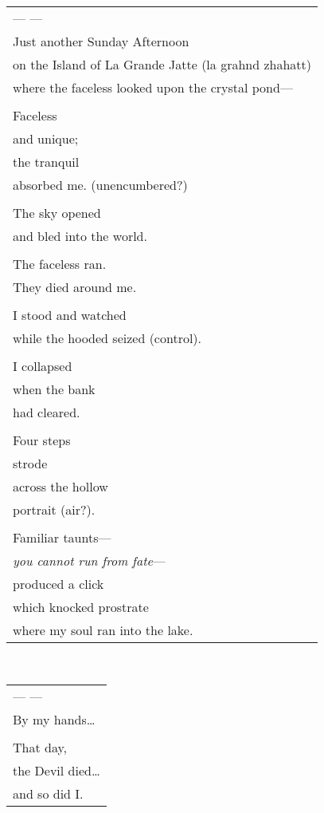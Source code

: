 \documentclass{article}
\begin{document}
\begin{tabular}{l}
\\
--- --- \\
Just another Sunday Afternoon \\
on the Island of La Grande Jatte (la grahnd zhahatt) \\
where the faceless looked upon the crystal pond--- \\
\\
Faceless \\
and unique; \\
the tranquil \\
absorbed me. (unencumbered?) \\
\\
The sky opened \\
and bled into the world. \\
\\
The faceless ran. \\
They died around me. \\
\\
I stood and watched \\
while the hooded seized (control). \\
\\
I collapsed \\
when the bank \\
had cleared. \\
\\
Four steps \\
strode \\
across the hollow \\
portrait (air?). \\
\\
Familiar taunts--- \\
\textit{you cannot run from fate}--- \\
produced a click \\
which knocked prostrate \\
where my soul ran into the lake. \\
\end{tabular} \\
\begin{tabular}{l}
\\
--- --- \\
By my hands\ldots{} \\
\\
That day, \\
the Devil died\ldots{} \\
and so did I. \\
\end{tabular}
\end{document}
